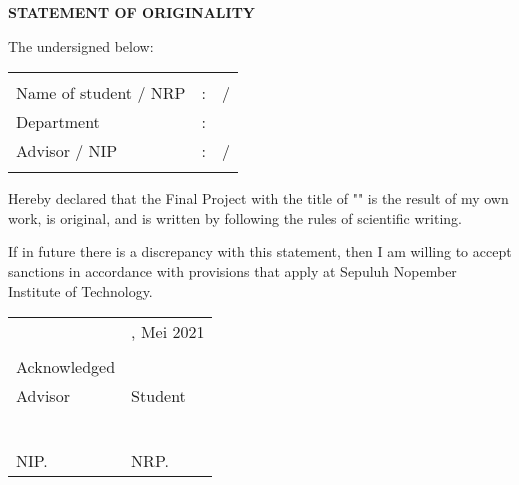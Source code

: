 \begin{center}
  \large
  \textbf{STATEMENT OF ORIGINALITY}
\end{center}

\thispagestyle{empty}

\vspace{2ex}


\noindent The undersigned below:

\noindent\begin{tabularx}{\textwidth}{l l X}
                        &   &                            \\
  Name of student / NRP & : & \name{} / \nrp{}           \\
  Department            & : & \engdepartment{}           \\
  Advisor / NIP         & : & \advisor{} / \advisornip{} \\
                        &   &                            \\
\end{tabularx}

Hereby declared that the Final Project with the title of "\engtatitle{}" is the result of my own work, is original, and is written by following the rules of scientific writing.

If in future there is a discrepancy with this statement, then I am willing to accept sanctions in accordance with provisions that apply at Sepuluh Nopember Institute of Technology.

\vspace{8ex}

\noindent\begin{tabularx}{\textwidth}{X l}
                     & \place{}, Mei 2021 \\
                     &                    \\
  Acknowledged       &                    \\
  Advisor            & Student            \\
                     &                    \\
                     &                    \\
                     &                    \\
                     &                    \\
                     &                    \\
  \advisor{}         & \name{}            \\
  NIP. \advisornip{} & NRP. \nrp{}        \\
\end{tabularx}